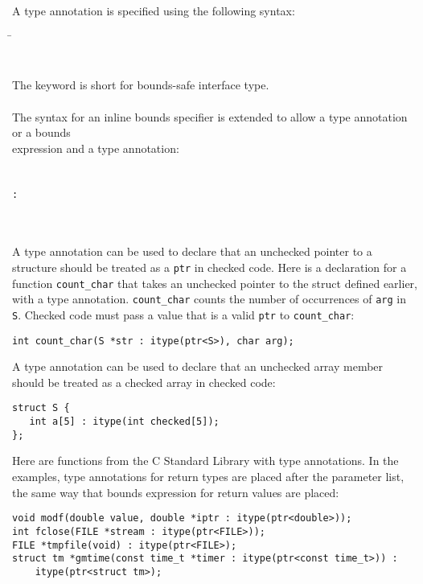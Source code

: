 A type annotation is specified using the following syntax:

\begin{tabbing}
\= \\
\>\code{)}\\
\\
The keyword  is short for bounds-safe  interface type.
\\
\\
The syntax for an inline bounds specifier is extended to
allow a type annotation or a bounds\\
expression and a type annotation:
\\
\\
\\
\> \lstinline|:|  \\
\>\code{:}  \\
\>\code{:}   \\
\>\code{:}  
\end{tabbing}

A type annotation can be used to declare that an unchecked
pointer to a structure should be treated as a \lstinline+ptr+ in
checked code. Here is a declaration for a function
\lstinline+count_char+ that takes
an unchecked pointer to the struct  defined earlier,
with a type annotation. \lstinline+count_char+ counts the number
of occurrences of \lstinline+arg+ in \lstinline+S+. Checked code must pass a
value that is a valid \lstinline+ptr+ to \lstinline+count_char+:
\begin{lstlisting}
int count_char(S *str : itype(ptr<S>), char arg);
\end{lstlisting}
A type annotation can be used to declare that an unchecked array member should
be treated as a checked array in checked code:
\begin{lstlisting}
struct S {
   int a[5] : itype(int checked[5]);
};
\end{lstlisting}

Here are functions from the C Standard Library with type annotations.
In the examples, type annotations for return types are placed 
after the parameter list, the same way that bounds expression for
return values are placed:
\begin{lstlisting}
void modf(double value, double *iptr : itype(ptr<double>));
int fclose(FILE *stream : itype(ptr<FILE>));
FILE *tmpfile(void) : itype(ptr<FILE>);
struct tm *gmtime(const time_t *timer : itype(ptr<const time_t>)) :
    itype(ptr<struct tm>);
\end{lstlisting}

